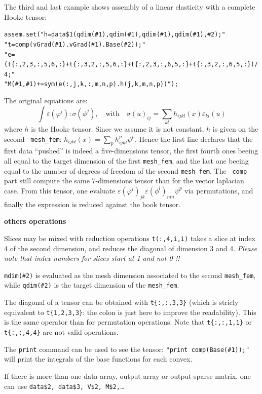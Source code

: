 \documentclass[11pt,a4paper]{article}
\begin{document}
The third and last example shows assembly of a linear elasticity with a complete Hooke tensor:
\begin{alltt}
 assem.set("h=data\$1(qdim(\#1),qdim(\#1),qdim(\#1),qdim(\#1),\#2);"
           "t=comp(vGrad(\#1).vGrad(\#1).Base(\#2));"
           "e=(t\{:,2,3,:,5,6,:\}+t\{:,3,2,:,5,6,:\}+t\{:,2,3,:,6,5,:\}+t\{:,3,2,:,6,5,:\})/4;"
           "M(\#1,\#1)+= sym(e(:,j,k,:,m,n,p).h(j,k,m,n,p))");
\end{alltt}
The original equations are:
$$\int\varepsilon(\varphi^i):\sigma(\phi^j),\quad\text{with}\quad
\sigma(u)_{ij}=\sum_{kl}h_{ijkl}(x)\varepsilon_{kl}(u)$$
where $h$ is the Hooke tensor.
Since we assume it is not constant, $h$ is given on the second {\tt
  mesh_fem}: $h_{ijkl}(x)=\sum_ph_{ijkl}^p\psi^p$.  Hence the first line
declares that the first data ``pushed'' is indeed a five-dimensions
tensor, the first fourth ones beeing all equal to the target dimension
of the first {\tt mesh_fem}, and the last one beeing equal to the
number of degrees of freedom of the second {\tt mesh_fem}.  The {\tt
  comp} part still compute the same 7-dimensions tensor than for the
vector laplacian case.  From this tensor, one evaluate
$\varepsilon(\varphi^i)_{jk}\varepsilon(\phi^l)_{mn}\psi^p$ via permutations, and finally the
expression is reduced against the hook tensor.

{\bf others operations}

Slices may be mixed with reduction operations {\tt t(:,4,i,i)} takes a slice at index 4 of the second dimension, and reduces the diagonal of dimension 3 and 4. {\em Please note that index numbers for slices start at 1 and not 0 !!} 

{\tt mdim(\#2)} is evaluated as the mesh dimension associated to the second {\tt mesh_fem}, while {\tt qdim(\#2)} is the target dimension of the {\tt mesh_fem}.

The diagonal of a tensor can be obtained with {\tt t\{:,:,3,3\}} (which is stricly equivalent to {\tt t\{1,2,3,3\}}: the colon is just here to improve the readability). This is the same operator than for permutation operations. Note that {\tt t\{:,:,1,1\}} or {\tt t\{:,:,4,4\}} are not valid operations. 

The {\tt print} command can be used to see the tensor: {\tt "print comp(Base(\#1));"} will print the integrals of the base functions for each convex.

If there is more than one data array, output array  or output sparse matrix, one can use {\tt data\$2, data\$3, V\$2, M\$2,}\ldots
\end{document}
